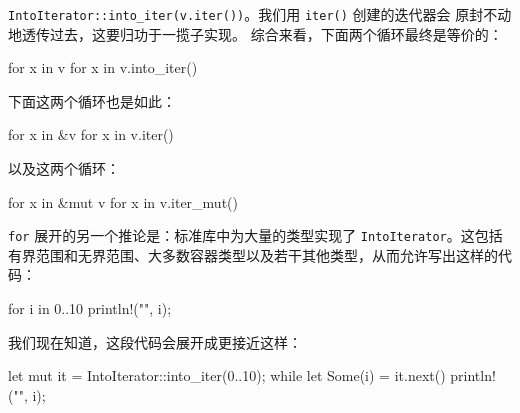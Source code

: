 \texttt{IntoIterator::\allowbreak{}into\_\allowbreak{}iter(\allowbreak{}v.\allowbreak{}iter(\allowbreak{})\allowbreak{})\allowbreak{}}。我们用 \texttt{iter()} 创建的迭代器会
原封不动地透传过去，这要归功于一揽子实现。
综合来看，下面两个循环最终是等价的：
\begin{codebox}[text]
for x in v {}
for x in v.into_iter() {}
\end{codebox}
下面这两个循环也是如此：
\begin{codebox}[text]
for x in &v {}
for x in v.iter() {}
\end{codebox}
以及这两个循环：
\begin{codebox}[rust]
for x in &mut v {}
for x in v.iter_mut() {}
\end{codebox}
\label{idx:idx_3131f3fa}
\texttt{for} 展开的另一个推论是：标准库中为大量的类型实现了 \texttt{IntoIterator}。这包括有界范围和无界范围、大多数容器类型以及若干其他类型，从而允许写出这样的代码：
\begin{codebox}[text]
for i in 0..10 {
    println!("{}", i);
}
\end{codebox}
我们现在知道，这段代码会展开成更接近这样：
\begin{codebox}[rust]
let mut it = IntoIterator::into_iter(0..10);
while let Some(i) = it.next() {
    println!("{}", i);
}
\end{codebox}
